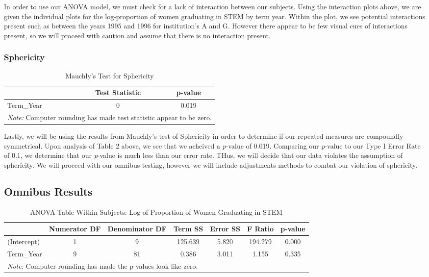 \documentclass[]{article}
\begin{document}
In order to use our ANOVA model, we must check for a lack of interaction
between our subjects. Using the interaction plots above, we are given
the individual plots for the log-proportion of women graduating in STEM
by term year. Within the plot, we see potential interactions present
such as between the years 1995 and 1996 for institution's A and G.
However there appear to be few visual cues of interactions present, so
we will proceed with caution and assume that there is no interaction
present.

\subsubsection{Sphericity}\label{sphericity}

\begin{table}[H]

\caption{\label{tab:Sphericity}Mauchly's Test for Sphericity}
\centering
\fontsize{12}{14}\selectfont
\begin{tabular}[t]{l|c|c}
\hline
  & Test Statistic & p-value\\
\hline
Term\_Year & 0 & 0.019\\
\hline
\multicolumn{3}{l}{\textit{Note: } Computer rounding has made test statistic appear to be zero.}\\
\end{tabular}
\end{table}

Lastly, we will be using the results from Mauchly's test of Sphericity
in order to determine if our repeated measures are compoundly
symmetrical. Upon analysis of Table 2 above, we see that we acheived a
\emph{p}-value of 0.019. Comparing our \emph{p}-value to our Type I
Error Rate of 0.1, we determine that our \emph{p}-value is much less
than our error rate. THus, we will decide that our data violates the
assumption of sphericity. We will proceed with our omnibus testing,
however we will include adjustments methods to combat our violation of
sphericity.

\subsection{Omnibus Results}\label{omnibus-results}

\begin{table}[H]

\caption{\label{tab:univariate Results}ANOVA Table Within-Subjects: Log of Proportion of Women Graduating in STEM}
\centering
\fontsize{12}{14}\selectfont
\begin{tabular}[t]{l|c|c|c|c|c|c}
\hline
  & Numerator DF & Denominator DF & Term SS & Error SS & F Ratio & p-value\\
\hline
(Intercept) & 1 & 9 & 125.639 & 5.820 & 194.279 & 0.000\\
\hline
Term\_Year & 9 & 81 & 0.386 & 3.011 & 1.155 & 0.335\\
\hline
\multicolumn{7}{l}{\textit{Note: } Computer rounding has made the p-values look like zero.}\\
\end{tabular}
\end{table}
\end{document}

